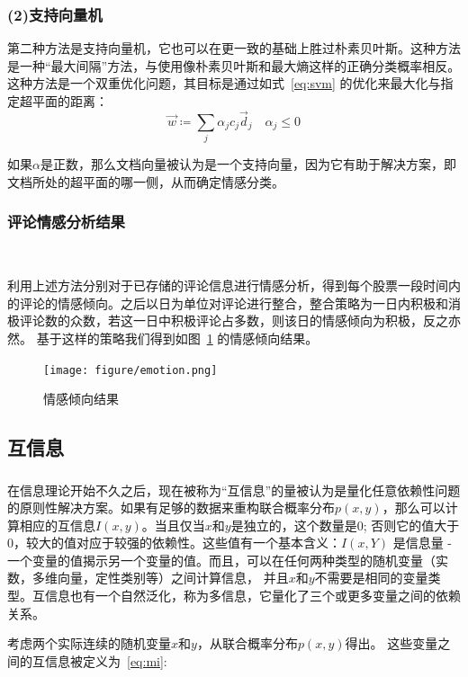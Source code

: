 \documentclass[cs4size,a4paper]{ctexart}
\numberwithin{equation}{section}
\numberwithin{table}{section}
\numberwithin{figure}{section}
\newcommand{\upcite}[1]{\textsuperscript{\textsuperscript{\cite{#1}}}}%
\begin{document}
\subsubsection*{(2)支持向量机}

第二种方法是支持向量机，它也可以在更一致的基础上胜过朴素贝叶斯。这种方法是一种“最大间隔”方法，与使用像朴素贝叶斯和最大熵这样的正确分类概率相反。这种方法是一个双重优化问题，其目标是通过如式~\ref{eq:svm}
的优化来最大化与指定超平面的距离：
\begin{equation}\label{eq:svm}
  \vec{w} \coloneqq \sum_{j}\alpha_{j}c_{j}\vec{d}_{j} \quad \alpha_{j}  \leq  0
\end{equation}

如果$\alpha$是正数，那么文档向量被认为是一个支持向量，因为它有助于解决方案，即文档所处的超平面的哪一侧，从而确定情感分类。

\subsubsection{评论情感分析结果}~\label{subsec:sentiment_result}

利用上述方法分别对于已存储的评论信息进行情感分析，得到每个股票一段时间内的评论的情感倾向。之后以日为单位对评论进行整合，整合策略为一日内积极和消极评论数的众数，若这一日中积极评论占多数，则该日的情感倾向为积极，反之亦然。
基于这样的策略我们得到如图~\ref{fig:emotion} 的情感倾向结果。
\begin{figure}
  \centering
  \captionsetup{justification=centering,margin=2cm}
  \texttt{[image: figure/emotion.png]}
\caption{情感倾向结果}
\label{fig:emotion}
\end{figure}

\subsection{互信息}

在信息理论开始不久之后\upcite{hockett1953mathematical}，现在被称为“互信息”的量被认为是量化任意依赖性问题的原则性解决方案。如果有足够的数据来重构联合概率分布$p(x,y)$，那么可以计算相应的互信息$I(x,y)$。当且仅当$x$和$y$是独立的，这个数量是0; 否则它的值大于0，较大的值对应于较强的依赖性。这些值有一个基本含义：$I(x,Y)$ 是信息量 - 一个变量的值揭示另一个变量的值。而且，可以在任何两种类型的随机变量（实数，多维向量，定性类别等）之间计算信息，
并且$x$和$y$不需要是相同的变量类型。互信息也有一个自然泛化，称为多信息，它量化了三个或更多变量之间的依赖关系。

考虑两个实际连续的随机变量$x$和$y$，从联合概率分布$p(x,y)$得出。 这些变量之间的互信息被定义为~\ref{eq:mi}:
\end{document}
